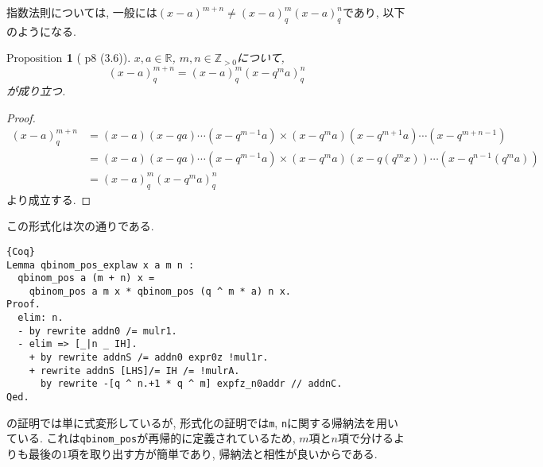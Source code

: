 \documentclass[11pt]{jsreport}
\theoremstyle{mystyle}
\newtheorem{prop}[df]{$\textrm{Proposition}$}
\newcommand{\bprop}{\begin{shadebox} \begin{prop}}
\newcommand{\eprop}{\end{prop} \end{shadebox}}
\newcommand{\bpf}{\begin{proof}}
\newcommand{\epf}{\end{proof}}
\newcommand{\Z}{\mathbb{Z}}
\newcommand{\R}{\mathbb{R}}
\newcommand{\0}{\textbf{0}}
\begin{document}
指数法則については, 一般には$(x - a)^{m + n} \neq (x - a)^m_q(x - a)^n_q$であり, 以下のようになる. 
\bprop[\cite{Kac} p8 (3.6)] \label{q_exp_low}
  $x,a\in\R$, $m,n\in\Z_{>0}$について, 
  \[
    (x-a)^{m+n}_q = (x-a)^m_q (x-q^ma)^n_q
  \]
  が成り立つ. 
\eprop
\bpf
  \begin{align*}
    (x-a)^{m+n}_q &= (x-a)(x-qa)\cdots(x-q^{m-1}a)
                         \times (x-q^ma)(x-q^{m+1}a)\cdots(x-q^{m+n-1})\\
                       &= (x-a)(x-qa)\cdots(x-q^{m-1}a)
                         \times (x-q^ma)(x-q(q^mx))\cdots(x-q^{n-1}(q^ma))\\
                       &= (x-a)^m_q(x-q^ma)^{n}_q
  \end{align*}
  より成立する.
\epf
この形式化は次の通りである. 
\begin{lstlisting}{Coq}
Lemma qbinom_pos_explaw x a m n :
  qbinom_pos a (m + n) x =
    qbinom_pos a m x * qbinom_pos (q ^ m * a) n x.
Proof.
  elim: n.
  - by rewrite addn0 /= mulr1.
  - elim => [_|n _ IH].
    + by rewrite addnS /= addn0 expr0z !mul1r.
    + rewrite addnS [LHS]/= IH /= !mulrA.
      by rewrite -[q ^ n.+1 * q ^ m] expfz_n0addr // addnC.
Qed.
\end{lstlisting}
\cite{Kac}の証明では単に式変形しているが, 形式化の証明では{\tt m}, {\tt n}に関する帰納法を用いている. これは{\tt qbinom\_pos}が再帰的に定義されているため, $m$項と$n$項で分けるよりも最後の$1$項を取り出す方が簡単であり, 帰納法と相性が良いからである. 
\end{document}

